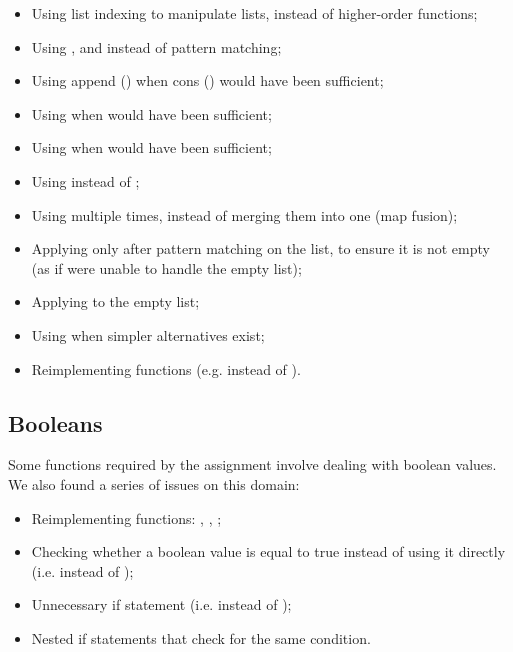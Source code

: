 \begin{itemize}
    \item Using list indexing to manipulate lists, instead of higher-order functions;
    \item Using ,  and  instead of pattern matching;
    \item Using append (\haskell{++}) when cons (\haskell{:}) would have been sufficient;
    \item Using  when  would have been sufficient;
    \item Using  when  would have been sufficient;
    \item Using  instead of ;
    \item Using  multiple times, instead of merging them into one (map fusion);
    \item Applying  only after pattern matching on the list, to ensure it is not empty (as if  were unable to handle the empty list);
    \item Applying  to the empty list;
    \item Using  when simpler alternatives exist; %
    \item Reimplementing functions (e.g.  instead of ). %
\end{itemize}

\subsection{Booleans}

Some functions required by the assignment involve dealing with boolean values. We also found a series of issues on this domain:

\begin{itemize}
    \item Reimplementing functions: , , ;
    \item Checking whether a boolean value is equal to true instead of using it directly (i.e.  instead of );
    \item Unnecessary if statement (i.e.  instead of );
    \item Nested if statements that check for the same condition.
\end{itemize}

